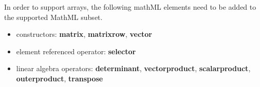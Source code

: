 In order to support arrays, the following mathML elements need to be added to the supported MathML subset. 
\begin{itemize}
\item constructors: {\bf matrix}, {\bf matrixrow}, {\bf vector}
\item element referenced operator: {\bf selector}
\item linear algebra operators: {\bf determinant}, {\bf vectorproduct}, {\bf scalarproduct}, {\bf outerproduct}, {\bf transpose}
\end{itemize}

